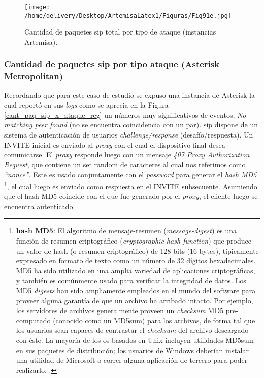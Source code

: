 \documentclass[a4paper,12pt]{report}
\begin{document}
{\begin{figure}[h!]
{\texttt{[image: /home/delivery/Desktop/ArtemisaLatex1/Figuras/Fig91e.jpg]}}
 \caption{Cantidad de paquetes \ac{sip} total por tipo de ataque (instancias Artemisa).}
\label{cant_paq_sip_x_ataque_arte}
\end{figure}

\subsubsection{Cantidad de paquetes \ac{sip} por tipo ataque (Asterisk Metropolitan)}
Recordando que para este caso de estudio se expuso una instancia de Asterisk
la cual reportó en sus \emph{logs} como se aprecia en la Figura \ref{cant_paq_sip_x_ataque_reg} un 
números muy significativos de eventos, \emph{No matching peer found}
(no se encuentra coincidencia con un par).
\ac{sip} dispone de un sistema de autenticación de usuarios
\emph{challenge/response} (desafío/respuesta). Un INVITE inicial es enviado al 
\emph{proxy} con el cual el dispositivo final desea comunicarse. El \emph{proxy} responde
luego con un mensaje \emph{407 Proxy Authorization Request}, que contiene un 
set random de caracteres al cual nos
referimos como \emph{``nonce''}. Este es usado conjuntamente con el
\emph{password} para generar el \emph{hash MD5}
\footnote{\textbf{hash MD5}: El algoritmo de mensaje-resumen
(\emph{message-digest}) es una función de resumen criptográfico
(\emph{\mbox{cryptographic} hash function}) que produce un valor de hash (o resumen
criptográfico) de 128-bits (16-bytes), típicamente expresado en formato de texto
como un número de 32 dígitos hexadecimales. MD5 ha sido utilizado en una amplia
variedad de aplicaciones criptográficas, y también es comúnmente usado para
verificar la integridad de datos. Los MD5 \emph{digests} han sido ampliamente
empleados en el mundo del software para proveer alguna garantía de que un
archivo ha arribado intacto. Por ejemplo, los servidores de archivos
generalmente proveen un \emph{checksum} MD5 pre-computado (conocido como un MD5sum)
para los archivos, de forma tal que los usuarios sean capaces de contrastar el
\emph{checksum} del archivo descargado con éste. La mayoría de los \ac{os}
basados en Unix incluyen utilidades MD5sum en sus paquetes de distribución;
los usuarios de Windows deberían instalar una utilidad de Microsoft o correr
alguna aplicación de tercero para poder realizarlo. \cite{pachghare}.}, 
el cual luego es enviado como respuesta en el INVITE subsecuente.
Asumiendo que el hash MD5 coincide con el que fue generado  por el \emph{proxy}, el
cliente luego se encuentra autenticado. 

}
\end{document}
